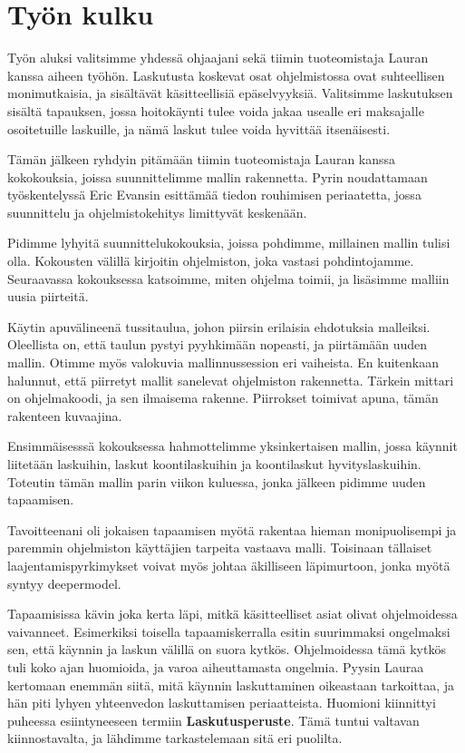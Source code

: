 \vspace{21.5pt}

\hypertarget{tyuxf6n-kulku}{%
\section{Työn kulku}\label{tyuxf6n-kulku}}

Työn aluksi valitsimme yhdessä ohjaajani sekä tiimin tuoteomistaja
Lauran kanssa aiheen työhön. Laskutusta koskevat osat ohjelmistossa ovat
suhteellisen monimutkaisia, ja sisältävät käsitteellisiä epäselvyyksiä.
Valitsimme laskutuksen sisältä tapauksen, jossa hoitokäynti tulee voida
jakaa usealle eri maksajalle osoitetuille laskuille, ja nämä laskut
tulee voida hyvittää itsenäisesti.

Tämän jälkeen ryhdyin pitämään tiimin tuoteomistaja Lauran kanssa
kokokouksia, joissa suunnittelimme mallin rakennetta. Pyrin noudattamaan
työskentelyssä Eric Evansin esittämää tiedon rouhimisen periaatetta,
jossa suunnittelu ja ohjelmistokehitys limittyvät keskenään.

Pidimme lyhyitä suunnittelukokouksia, joissa pohdimme, millainen mallin
tulisi olla. Kokousten välillä kirjoitin ohjelmiston, joka vastasi
pohdintojamme. Seuraavassa kokouksessa katsoimme, miten ohjelma toimii,
ja lisäsimme malliin uusia piirteitä.

Käytin apuvälineenä tussitaulua, johon piirsin erilaisia ehdotuksia
malleiksi. Oleellista on, että taulun pystyi pyyhkimään nopeasti, ja
piirtämään uuden mallin. Otimme myös valokuvia mallinnussession eri
vaiheista. En kuitenkaan halunnut, että piirretyt mallit sanelevat
ohjelmiston rakennetta. Tärkein mittari on ohjelmakoodi, ja sen
ilmaisema rakenne. Piirrokset toimivat apuna, tämän rakenteen kuvaajina.

Ensimmäisesssä kokouksessa hahmottelimme yksinkertaisen mallin, jossa
käynnit liitetään laskuihin, laskut koontilaskuihin ja koontilaskut
hyvityslaskuihin. Toteutin tämän mallin parin viikon kuluessa, jonka
jälkeen pidimme uuden tapaamisen.

Tavoitteenani oli jokaisen tapaamisen myötä rakentaa hieman
monipuolisempi ja paremmin ohjelmiston käyttäjien tarpeita vastaava
malli. Toisinaan tällaiset laajentamispyrkimykset voivat myös johtaa
äkilliseen läpimurtoon, jonka myötä syntyy
\gls{deepermodel}.\cite{evans:ddd}

Tapaamisissa kävin joka kerta läpi, mitkä käsitteelliset asiat olivat
ohjelmoidessa vaivanneet. Esimerkiksi toisella tapaamiskerralla esitin
suurimmaksi ongelmaksi sen, että käynnin ja laskun välillä on suora
kytkös. Ohjelmoidessa tämä kytkös tuli koko ajan huomioida, ja varoa
aiheuttamasta ongelmia. Pyysin Lauraa kertomaan enemmän siitä, mitä
käynnin laskuttaminen oikeastaan tarkoittaa, ja hän piti lyhyen
yhteenvedon laskuttamisen periaatteista. Huomioni kiinnittyi puheessa
esiintyneeseen termiin \textbf{Laskutusperuste}. Tämä tuntui valtavan
kiinnostavalta, ja lähdimme tarkastelemaan sitä eri puolilta.

